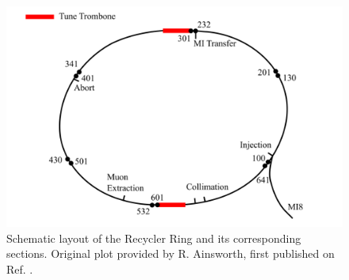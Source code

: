 \begin{figure}[H]
   \centering
   \includegraphics[width=\columnwidth]{chapter3/RRschematic.png}
   \caption{Schematic layout of the Recycler Ring and its corresponding sections. Original plot provided by R. Ainsworth, first published on Ref. \cite{rr1}.}
   \label{fig:rrschematic}
\end{figure}

